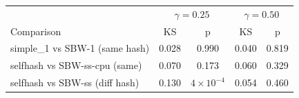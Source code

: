 \begin{tabular}{@{}l|cc|cc@{}}
\toprule
& \multicolumn{2}{c|}{$\gamma=0.25$} & \multicolumn{2}{c}{$\gamma=0.50$} \\
Comparison & KS & p & KS & p \\
\midrule
simple\_1 vs SBW-1 (same hash) & 0.028 & 0.990 & 0.040 & 0.819 \\
selfhash vs SBW-ss-cpu (same) & 0.070 & 0.173 & 0.060 & 0.329 \\
selfhash vs SBW-ss (diff hash) & 0.130 & $4{\times}10^{-4}$ & 0.054 & 0.460 \\
\bottomrule
\end{tabular}
